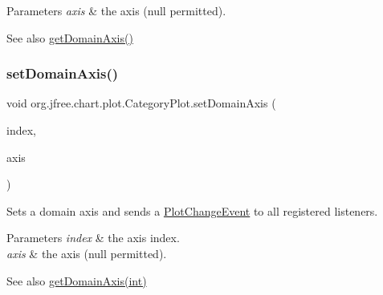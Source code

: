 \begin{DoxyParams}{Parameters}
{\em axis} & the axis ({\ttfamily null} permitted).\\
\hline
\end{DoxyParams}
\begin{DoxySeeAlso}{See also}
\mbox{\hyperlink{classorg_1_1jfree_1_1chart_1_1plot_1_1_category_plot_a18e5a481aee2fe569efaf4bc8abecd17}{get\+Domain\+Axis()}} 
\end{DoxySeeAlso}
\mbox{\label{classorg_1_1jfree_1_1chart_1_1plot_1_1_category_plot_a1f9906f8a205d94eee2611e4ffd21d70}} 
\subsubsection{\texorpdfstring{set\+Domain\+Axis()}{setDomainAxis()}\hspace{0.1cm}{\footnotesize\ttfamily [2/3]}}
{\footnotesize\ttfamily void org.\+jfree.\+chart.\+plot.\+Category\+Plot.\+set\+Domain\+Axis (\begin{DoxyParamCaption}\item[{int}]{index,  }\item[{\mbox{\hyperlink{classorg_1_1jfree_1_1chart_1_1axis_1_1_category_axis}{Category\+Axis}}}]{axis }\end{DoxyParamCaption})}

Sets a domain axis and sends a \mbox{\hyperlink{}{Plot\+Change\+Event}} to all registered listeners.


\begin{DoxyParams}{Parameters}
{\em index} & the axis index. \\
\hline
{\em axis} & the axis ({\ttfamily null} permitted).\\
\hline
\end{DoxyParams}
\begin{DoxySeeAlso}{See also}
\mbox{\hyperlink{classorg_1_1jfree_1_1chart_1_1plot_1_1_category_plot_ab1dc3f8f848b309404d1a4ca963b11da}{get\+Domain\+Axis(int)}} 
\end{DoxySeeAlso}
\mbox{\label{classorg_1_1jfree_1_1chart_1_1plot_1_1_category_plot_ac80c404198c7794ab85454b5d9c6f23a}} 
